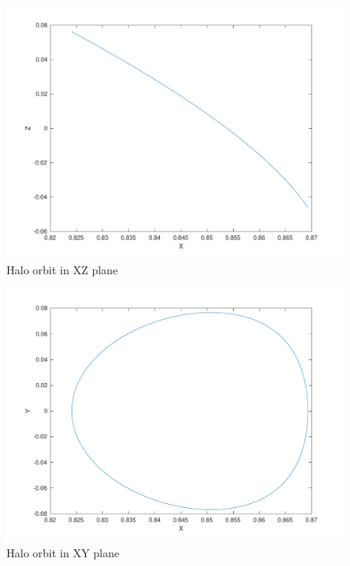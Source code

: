 \begin{figure}[H]
    \centering
    \includegraphics[width=\textwidth]{../Figure/Q2/fig3}
    \caption{Halo orbit in XZ plane}
\end{figure}

\begin{figure}[H]
    \centering
    \includegraphics[width=\textwidth]{../Figure/Q2/fig4}
    \caption{Halo orbit in XY plane}
\end{figure}


